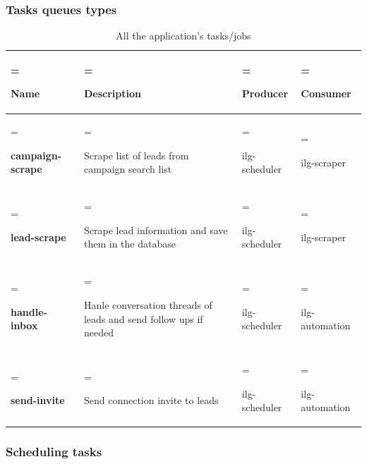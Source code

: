 \subsubsection{Tasks queues types}
\begin{table}[H]
	\renewcommand{\arraystretch}{1.5}%
	\caption{All the application's tasks/jobs}
	\centering
	\medskip
	\begin{tabularx}{1\textwidth} {
					| >{\hsize=1.2\hsize\linewidth=\hsize\raggedright\arraybackslash}X
					| >{\hsize=1.2\hsize\linewidth=\hsize\raggedright\arraybackslash}X
					| >{\hsize=0.8\hsize\linewidth=\hsize\raggedright\arraybackslash}X
					| >{\hsize=0.8\hsize\linewidth=\hsize\raggedright\arraybackslash}X |}
			\hline
			\rowcolor{primary} \textbf {Name} & \textbf {Description}   & \textbf {Producer} & \textbf {Consumer}                                                                                                                                                            \\
			\hline
			\textbf {campaign-scrape}     & Scrape list of leads from campaign search list  & ilg-scheduler & ilg-scraper  \\
			\hline
			\textbf {lead-scrape}     & Scrape lead information and save them in the database  & ilg-scheduler & ilg-scraper  \\
			\hline
			\textbf {handle-inbox}     & Hanle conversation threads of leads and send follow ups if needed  & ilg-scheduler & ilg-automation  \\
			\hline
			\textbf {send-invite}     & Send connection invite to leads  & ilg-scheduler & ilg-automation  \\
			\hline
	\end{tabularx}
\end{table}
\subsubsection{Scheduling tasks}
